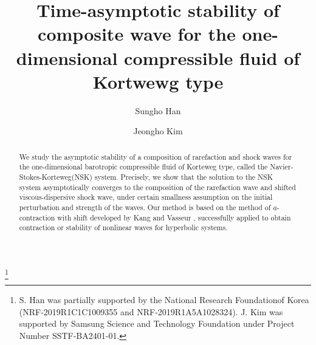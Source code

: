 \documentclass[11pt,reqno]{amsart}
\title[Navier-Stokes-Korteweg equations]{Time-asymptotic stability of composite wave for the one-dimensional compressible fluid of Kortwewg type}
\author[Han]{Sungho Han}
\author[Kim]{Jeongho Kim}
\begin{document}
\newtheorem{theorem}{Theorem}[section]
\newtheorem{lemma}{Lemma}[section]
\newtheorem{corollary}{Corollary}[section]
\newtheorem{proposition}{Proposition}[section]
\newtheorem{remark}{Remark}[section]
\newtheorem{definition}{Definition}[section]
\renewcommand{\theequation}{\thesection.\arabic{equation}}
\renewcommand{\thetheorem}{\thesection.\arabic{theorem}}
\renewcommand{\thelemma}{\thesection.\arabic{lemma}}
\newcommand{\bbr}{\mathbb R}
\newcommand{\R}{\mathbb{R}}
\newcommand{\e}{\varepsilon}
\newcommand{\pa}{\partial}
\newcommand{\oU}{\overline{U}}
\newcommand{\ou}{\overline{u}}
\newcommand{\ov}{\overline{v}}
\newcommand{\ow}{\overline{w}}
\newcommand{\ur}{u^R}
\newcommand{\us}{u^S}
\newcommand{\vr}{v^R}
\newcommand{\vs}{v^S}
\newcommand{\rw}{w^R}
\newcommand{\ws}{w^S}
\newcommand{\m}{\overline{\mu}}
\newcommand{\mr}{\mu^R}
\newcommand{\ms}{\mu^S}
\newcommand{\ok}{\overline{\kappa}}
\newcommand{\kr}{\kappa^R}
\newcommand{\ks}{\kappa^S}
\newcommand{\norm}[1]{\left\lVert#1\right\rVert}





\thanks{S. Han was partially supported by the National Research Foundationof Korea (NRF-2019R1C1C1009355 and NRF-2019R1A5A1028324). J. Kim was supported by Samsung Science and Technology Foundation under Project Number SSTF-BA2401-01.}


\begin{abstract} 
	We study the asymptotic stability of a composition of rarefaction and shock waves for the one-dimensional barotropic compressible fluid of Korteweg type, called the Navier-Stokes-Korteweg(NSK) system. Precisely, we show that the solution to the NSK system asymptotically converges to the composition of the rarefaction wave and shifted viscous-dispersive shock wave, under certain smallness assumption on the initial perturbation and strength of the waves. Our method is based on the method of $a$-contraction with shift developed by Kang and Vasseur \cite{KV16}, successfully applied to obtain contraction or stability of nonlinear waves for hyperbolic systems.
\end{abstract}
\end{document}
